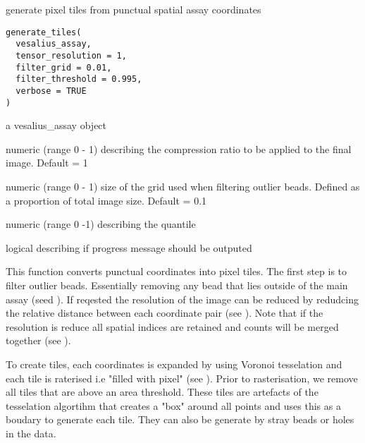 \documentclass[a4paper]{book}
\begin{document}
%
\begin{Description}
generate pixel tiles from punctual spatial assay coordinates
\end{Description}
%
\begin{Usage}
\begin{verbatim}
generate_tiles(
  vesalius_assay,
  tensor_resolution = 1,
  filter_grid = 0.01,
  filter_threshold = 0.995,
  verbose = TRUE
)
\end{verbatim}
\end{Usage}
%
\begin{Arguments}
\begin{ldescription}
\item[\code{vesalius\_assay}] a vesalius\_assay object

\item[\code{tensor\_resolution}] numeric (range 0 - 1) describing the compression
ratio to be applied to the final image. Default = 1

\item[\code{filter\_grid}] numeric (range 0 - 1) size of the grid used when filtering
outlier beads. Defined as a proportion of total image size. Default = 0.1

\item[\code{filter\_threshold}] numeric (range 0 -1) describing the quantile

\item[\code{verbose}] logical describing if progress message should be outputed
\end{ldescription}
\end{Arguments}
%
\begin{Details}
This function converts punctual coordinates into pixel tiles.
The first step is to filter outlier beads. Essentially removing any bead 
that lies outside of the main assay (seed ). If 
reqested the resolution of the image can be reduced by redudcing the 
relative distance between each coordinate pair 
(see ). Note that if the 
resolution is reduce all spatial indices are retained and counts
will be merged together (see ). 

To create tiles, each coordinates is expanded by using Voronoi 
tesselation and each tile is raterised i.e "filled with pixel" 
(see ). Prior to rasterisation, we
remove all tiles that are above an area threshold. These tiles
are artefacts of the tesselation algortihm that creates a "box"
around all points and uses this as a boudary to generate each tile.
They can also be generate by stray beads or holes in the data.
\end{Details}
\end{document}

